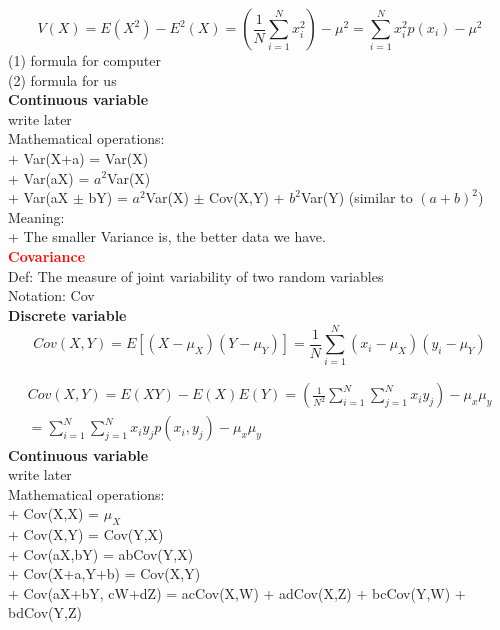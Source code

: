 \documentclass[12pt,a4paper]{article}
\newcommand{\red}[1]{\textcolor{red}{\textbf{#1}}}
\newcommand{\subscript}[1]{_{{#1}}}
\begin{document}
\begin{equation}
V(X) = E(X^2) - E^2(X) =
\left(\frac{1}{N}\sum_{i=1}^{N} x^2\subscript{i}\right) - \mu^2 =
\sum_{i=1}^{N} x^2\subscript{i}p(x\subscript{i}) - \mu^2
\end{equation}
(1) formula for computer\\
(2) formula for us\\

\noindent \textbf{Continuous variable}\\
write later\\

\noindent Mathematical operations:\\
+ Var(X+a) = Var(X)\\
+ Var(aX) = $a^2$Var(X)\\
+ Var(aX $\pm$ bY) = $a^2$Var(X) $\pm$ Cov(X,Y) + $b^2$Var(Y) (similar to $(a+b)^2$)\\

\noindent Meaning:\\
+ The smaller Variance is, the better data we have.\\

\noindent\textbf{\red{Covariance}}\\
Def: The measure of joint variability of two random variables\\
Notation: Cov\\
\textbf{Discrete variable}
\begin{equation}
Cov(X,Y) = E\left[(X-\mu\subscript{X})(Y-\mu\subscript{Y})\right] = \frac{1}{N}\sum_{i=1}^{N} (x\subscript{i}-\mu\subscript{X})(y\subscript{i}-\mu\subscript{Y}) 
\end{equation}

\begin{equation}
\begin{aligned}
Cov(X,Y) = E(XY) - E(X)E(Y)
=\left(\frac{1}{N^2}\sum_{i=1}^{N}\sum_{j=1}^{N}x\subscript{i}y\subscript{j}\right)-
\mu\subscript{x}\mu\subscript{y}\\
=\sum_{i=1}^{N}\sum_{j=1}^{N} x\subscript{i}y\subscript{j}p(x\subscript{i},y\subscript{j}) -
\mu\subscript{x}\mu\subscript{y}
\end{aligned}
\end{equation}
\noindent \textbf{Continuous variable}\\
write later\\

\noindent Mathematical operations:\\
+ Cov(X,X) = $\mu\subscript{X}$\\
+ Cov(X,Y) = Cov(Y,X)\\
+ Cov(aX,bY) = abCov(Y,X)\\
+ Cov(X+a,Y+b) = Cov(X,Y)\\
+ Cov(aX+bY, cW+dZ) = acCov(X,W) + adCov(X,Z) + bcCov(Y,W) + bdCov(Y,Z)\\
\end{document}
